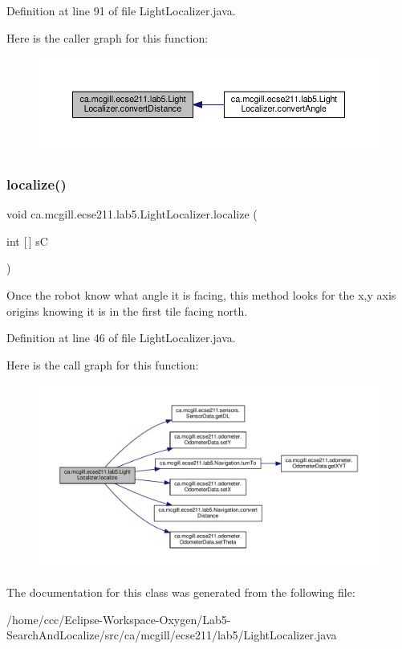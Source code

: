 Definition at line 91 of file Light\+Localizer.\+java.

Here is the caller graph for this function\+:\nopagebreak
\begin{figure}[H]
\begin{center}
\leavevmode
\includegraphics[width=350pt]{classca_1_1mcgill_1_1ecse211_1_1lab5_1_1_light_localizer_a9eebe889aa2d4d2e881f413cc727cd9c_icgraph}
\end{center}
\end{figure}
\mbox{\label{classca_1_1mcgill_1_1ecse211_1_1lab5_1_1_light_localizer_a441f56a899fae5bc9c1d6a6d25fbe0bb}} 
\subsubsection{\texorpdfstring{localize()}{localize()}}
{\footnotesize\ttfamily void ca.\+mcgill.\+ecse211.\+lab5.\+Light\+Localizer.\+localize (\begin{DoxyParamCaption}\item[{int \mbox{[}$\,$\mbox{]}}]{sC }\end{DoxyParamCaption})}

Once the robot know what angle it is facing, this method looks for the x,y axis origins knowing it is in the first tile facing north. 

Definition at line 46 of file Light\+Localizer.\+java.

Here is the call graph for this function\+:\nopagebreak
\begin{figure}[H]
\begin{center}
\leavevmode
\includegraphics[width=350pt]{classca_1_1mcgill_1_1ecse211_1_1lab5_1_1_light_localizer_a441f56a899fae5bc9c1d6a6d25fbe0bb_cgraph}
\end{center}
\end{figure}


The documentation for this class was generated from the following file\+:\begin{DoxyCompactItemize}
\item 
/home/ccc/\+Eclipse-\/\+Workspace-\/\+Oxygen/\+Lab5-\/\+Search\+And\+Localize/src/ca/mcgill/ecse211/lab5/Light\+Localizer.\+java\end{DoxyCompactItemize}
